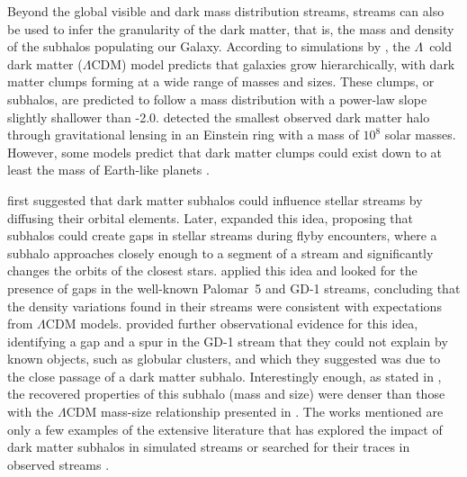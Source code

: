   
  Beyond the global visible and dark mass distribution streams, streams can also be used to infer the granularity of the dark matter, that is, the mass and density of the subhalos populating our Galaxy. According to simulations by \citet{2008MNRAS.391.1685S}, the $\Lambda$~cold dark matter ($\Lambda$CDM) model predicts that galaxies grow hierarchically, with dark matter clumps forming at a wide range of masses and sizes. These clumps, or subhalos, are predicted to follow a mass distribution with a power-law slope slightly shallower than -2.0. \citet{2012Natur.481..341V} detected the smallest observed dark matter halo through gravitational lensing in an Einstein ring with a mass of $10^8$ solar masses. However, some models predict that dark matter clumps could exist down to at least the mass of Earth-like planets \citep[see]{2005JCAP...08..003G, 2021arXiv211101148A}. 

  \citet{2002MNRAS.332..915I} first suggested that dark matter subhalos could influence stellar streams by diffusing their orbital elements. Later, \citet{2012ApJ...748...20C} expanded this idea, proposing that subhalos could create gaps in stellar streams during flyby encounters, where a subhalo approaches closely enough to a segment of a stream and significantly changes the orbits of the closest stars. \citet{2013ApJ...768..171C} applied this idea and looked for the presence of gaps in the well-known Palomar~5 and GD-1 streams, concluding that the density variations found in their streams were consistent with expectations from $\Lambda$CDM models. \citet{2019ApJ...880...38B} provided further observational evidence for this idea, identifying a gap and a spur in the GD-1 stream that they could not explain by known objects, such as globular clusters, and which they suggested was due to the close passage of a dark matter subhalo. Interestingly enough, as stated in \citet{2019ApJ...880...38B}, the recovered properties of this subhalo (mass and size) were denser than those with the $\Lambda$CDM mass-size relationship presented in \cite{2017MNRAS.466.4974M}. The works mentioned are only a few examples of the extensive literature that has explored the impact of dark matter subhalos in simulated streams \citep{2016ApJ...828L..10H, 2021MNRAS.507.1999H, 2021JCAP...10..043B, 2024arXiv240402953H, 2025ApJ...983...68N} or searched for their traces in observed streams \citep{2016MNRAS.460.2711T, 2017MNRAS.470...60E, 2020ApJ...889...70B, 2020ApJ...892L..37B}.

